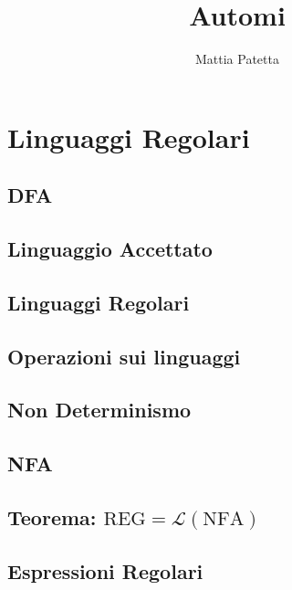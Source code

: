 \documentclass{article}
\title{Automi}
\author{Mattia Patetta}
\begin{document}
\maketitle

\tableofcontents

\newpage

\section{Linguaggi Regolari}

\subsection{DFA}

\subsection{Linguaggio Accettato}

\subsection{Linguaggi Regolari}

\subsection{Operazioni sui linguaggi}

\subsection{Non Determinismo}

\subsection{NFA}

\subsection{Teorema: $\mathrm{REG} = \mathcal{L}(\mathrm{NFA})$}

\subsection{Espressioni Regolari}
\end{document}

